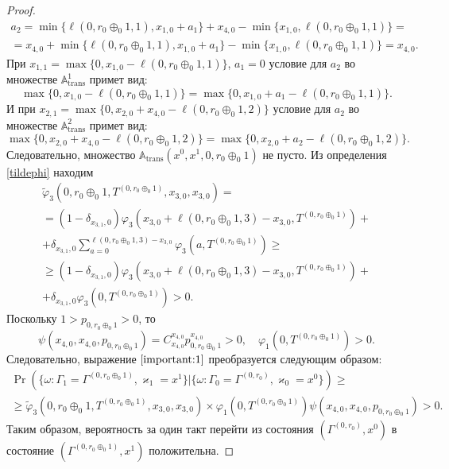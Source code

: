 \begin{proof}
\begin{multline*}
a_2=\min{\{\ell(0,  r_0\oplus_{0}1,  1),  x_{1,  0} + a_1}\} +x_{4,  0}-\min{\{x_{1,  0},  \ell(0,  r_0\oplus_{0}1,  1)\}}  = \\ =
x_{4,  0} + \min{\{\ell(0,  r_0\oplus_{0}1,  1),  x_{1,  0} + a_1}\} -\min{\{x_{1,  0},  \ell(0,  r_0\oplus_{0}1,  1)\}}  = x_{4,  0}.
\end{multline*}
При $x_{1,  1} = \max{\{0,  x_{1,  0} - \ell(0,  r_0\oplus_{0}1,  1)\}}$,  $a_1 = 0$ условие для $a_2$ во множестве ${\mathbb A}_{\mathrm{trans}}^1$ примет вид:
\begin{equation*}
\max{\{0,  x_{1, 0} - \ell(0,  r_0\oplus_{0}1,  1)\}}  =\max{\{0,  x_{1, 0}+a_1-\ell(0,  r_0\oplus_{0}1,  1)\}}.
\end{equation*}
И при $x_{2,  1} = \max{\{0,  x_{2,  0} + x_{4,  0}  - \ell(0,  r_0\oplus_{0}1,  2)\}}$ условие для $a_2$ во множестве ${\mathbb A}_{\mathrm{trans}}^2$ примет вид:
\begin{equation*}
    \max{\{0,  x_{2,  0} + x_{4,  0}  - \ell(0,  r_0\oplus_{0}1,  2)\}} 
=\max{\{0,  x_{2,  0}+a_2-\ell(0,  r_0\oplus_{0}1,  2)\}}.
\end{equation*}
Следовательно,  множество ${\mathbb A}_{\mathrm{trans}}(x^0,  x^1,  0,  r_0\oplus_{0}1) $ не пусто.
Из определения \eqref{tildephi} находим
\begin{multline*}
\widetilde{\varphi}_3(0,  r_0\oplus_{0}1,  T^{(0,  r_0\oplus_{0}1)},  x_{3,  0},  x_{3,  0}) = \\ =
 (1-\delta_{x_{3,  1},  0}) \varphi_3(x_{3,  0} + \ell(0,  r_0\oplus_{0}1,  3) - x_{3,  0},  T^{(0,  r_0\oplus_{0}1)} )
+\\
+\delta_{x_{3,  1},  0} \sum_{a=0}^{ \ell(0,  r_0\oplus_{0}1,  3) - x_{3,  0} } \varphi_3 (a, T^{(0,  r_0\oplus_{0}1)})
\geqslant\\ \geqslant (1-\delta_{x_{3,  1},  0}) \varphi_3(x_{3,  0} + \ell (0,  r_0\oplus_{0}1,  3) - x_{3,  0}, T^{(0,  r_0\oplus_{0}1)} ) + \\
+\delta_{x_{3,  1},  0} \varphi_3 (0,  T^{(0,  r_0\oplus_{0}1)}) > 0.
\end{multline*}
Поскольку $1>p_{0,  r_0\oplus_{0}1} > 0$,  то 
$$\psi(x_{4, 0},  x_{4, 0},  p_{0,  r_0\oplus_{0}1}) = C_{x_{4,  0}}^{x_{4,  0}} p_{0,  r_0\oplus_{0}1}^{x_{4,  0}} > 0,  \quad \varphi_1(0,  T^{(0,  r_0\oplus_{0}1)}) > 0.$$ Следовательно,  выражение $\eqref{important:1}$ преобразуется следующим образом:
\begin{multline*}
\Pr (\{\omega\colon\Gamma_{1}=\Gamma^{(0,  r_0\oplus_{0}1)}, \varkappa_{1}=x^1 \}|\{\omega\colon \Gamma_{0}=\Gamma^{(0,  r_0)}, \varkappa_0=x^0\})\geqslant \\
\geqslant \widetilde{\varphi}_3(0,  r_0\oplus_{0}1,  T^{(0,  r_0\oplus_{0}1)},  x_{3,  0},  x_{3,  0})
\times
\varphi_1(0,  T^{(0,  r_0\oplus_{0}1)}) \psi(x_{4,  0}, x_{4,  0},  p_{0,   r_0\oplus_{0}1}) > 0.
\end{multline*}
Таким образом, вероятность за один такт перейти из состояния $(\Gamma^{(0,  r_0)},  x^0)$ в состояние $ (\Gamma^{(0,  r_0\oplus_{0}1)},  x^1)$ положительна.


\end{proof}
